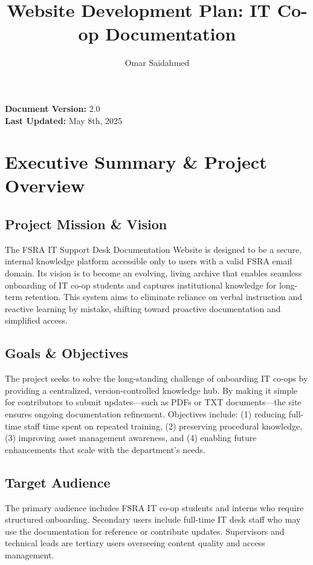 \documentclass[11pt,a4paper]{article}
\title{Website Development Plan: IT Co-op Documentation}
\author{Omar Saidahmed}
\begin{document}
\maketitle
\begin{center}
  \textbf{Document Version:} 2.0 \\
  \textbf{Last Updated:} May 8th, 2025 \\
\end{center}
\vspace{0.5cm}
\hrulefill
\vspace{1cm}

\tableofcontents
\newpage


\section{Executive Summary \& Project Overview}

\subsection{Project Mission \& Vision}
The FSRA IT Support Desk Documentation Website is designed to be a secure, internal knowledge platform accessible only to users with a valid FSRA email domain. Its vision is to become an evolving, living archive that enables seamless onboarding of IT co-op students and captures institutional knowledge for long-term retention. This system aims to eliminate reliance on verbal instruction and reactive learning by mistake, shifting toward proactive documentation and simplified access.

\subsection{Goals \& Objectives}
The project seeks to solve the long-standing challenge of onboarding IT co-ops by providing a centralized, version-controlled knowledge hub. By making it simple for contributors to submit updates—such as PDFs or TXT documents—the site ensures ongoing documentation refinement. Objectives include: (1) reducing full-time staff time spent on repeated training, (2) preserving procedural knowledge, (3) improving asset management awareness, and (4) enabling future enhancements that scale with the department’s needs.

\subsection{Target Audience}
The primary audience includes FSRA IT co-op students and interns who require structured onboarding. Secondary users include full-time IT desk staff who may use the documentation for reference or contribute updates. Supervisors and technical leads are tertiary users overseeing content quality and access management.
\end{document}
